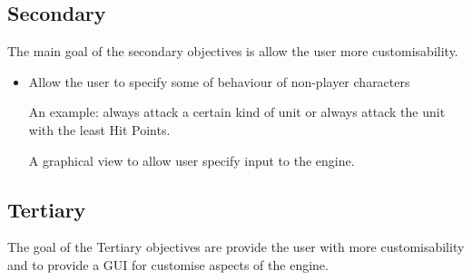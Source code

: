 \subsection{Secondary}
\label{secondary}
The main goal of the secondary objectives is allow the user more customisability. 
\begin{itemize}
	\tick Tiles have \texttt{height}, where units can only move to tiles of a smilier height.
	\cross Tiles that are not passable such as sea, lava, etc.
	
	\tick Tiles have different movement costs associated with them.
	
	\tick A combat system that includes 
	\begin{itemize}
		\tick \texttt{combat} between non-adjacent units,
	\end{itemize}
	
	\tick Players have items such as weapons that affect the result of combat between units. 
	\begin{itemize}
		\tick Including long distance weapons for the player and AI.
	\end{itemize}
	
	\cross Direction and height of the character's tile affects attack.
	
	\tick Sound effects.
	\tick Music.
	
	\cross Saving and loading games.
	
	\item Allow the user to specify some of behaviour of non-player characters
	\begin{itemize}
		\cross An example: always attack a certain kind of unit or always attack the unit with the least Hit Points.
	\end{itemize}
	
	\tick A graphical view to allow user specify input to the engine.
\end{itemize}

\subsection{Tertiary} 
\label{tertiary}
The goal of the Tertiary objectives are provide the user with more customisability and to provide a GUI for customise aspects of the engine. 

